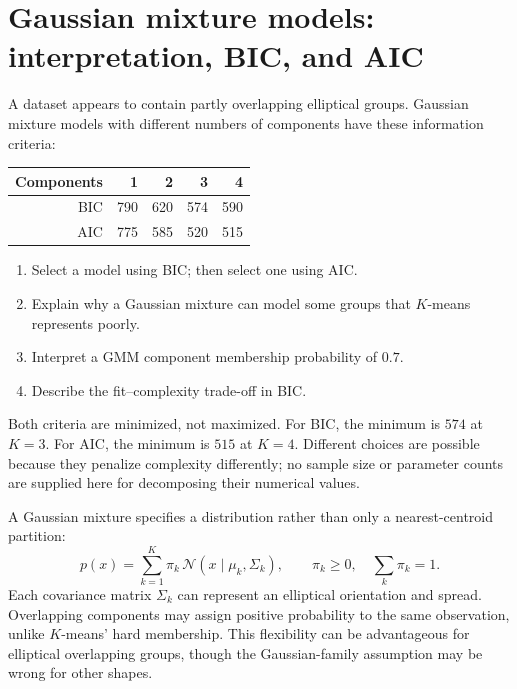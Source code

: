 \section{Gaussian mixture models: interpretation, BIC, and AIC}
\label{sec:ex4}
\begin{problem}
A dataset appears to contain partly overlapping elliptical groups. Gaussian mixture models with different numbers of components have these information criteria:
\begin{center}\begin{tabular}{@{}rrrrr@{}}\toprule Components&1&2&3&4\\\midrule BIC&790&620&574&590\\ AIC&775&585&520&515\\\bottomrule\end{tabular}\end{center}
\begin{enumerate}[label=\textbf{(\alph*)}]
\item Select a model using BIC; then select one using AIC.
\item Explain why a Gaussian mixture can model some groups that $K$-means represents poorly.
\item Interpret a GMM component membership probability of $0.7$.
\item Describe the fit--complexity trade-off in BIC.
\end{enumerate}
\end{problem}

Both criteria are minimized, not maximized. For BIC, the minimum is $\boxed{574}$ at $\boxed{K=3}$. For AIC, the minimum is $\boxed{515}$ at $\boxed{K=4}$. Different choices are possible because they penalize complexity differently; no sample size or parameter counts are supplied here for decomposing their numerical values.

A Gaussian mixture specifies a distribution rather than only a nearest-centroid partition:
\[
p(x)=\sum_{k=1}^{K}\pi_k\,\mathcal N(x\mid\mu_k,\Sigma_k),\qquad
\pi_k\geq0,\quad \sum_k\pi_k=1.
\]
Each covariance matrix $\Sigma_k$ can represent an elliptical orientation and spread. Overlapping components may assign positive probability to the same observation, unlike $K$-means' hard membership. This flexibility can be advantageous for elliptical overlapping groups, though the Gaussian-family assumption may be wrong for other shapes.

